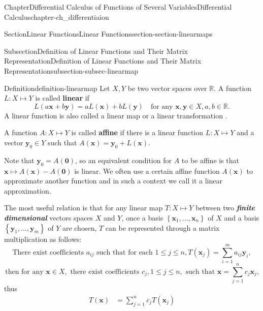 \documentclass[oneside,10pt,]{book}
\newcommand{\alert}[1]{\textbf{\textit{#1}}}
\newcommand{\terminology}[1]{\textbf{#1}}
\numberwithin{equation}{section}
\newcommand{\bx}{\mathbf{x}}
\newcommand{\by}{\mathbf{y}}
\newcommand{\bbR}{\mathbb{R}}
\newcommand{\amp}{&}
\begin{document}
\begin{chapterptx}{Chapter}{Differential Calculus of Functions of Several Variables}{}{Differential Calculus}{}{}{chapter-ch_differentiaion}
\begin{sectionptx}{Section}{Linear Functions}{}{Linear Functions}{}{}{section-section-linearmaps}
\typeout{************************************************}
%
\begin{subsectionptx}{Subsection}{Definition of  Linear Functions and Their Matrix Representation}{}{Definition of  Linear Functions and Their Matrix Representation}{}{}{subsection-subsec-linearmap}
\begin{definition}{Definition}{}{definition-linearmap}%
%
Let \(X, Y\) be two vector spaces over \(\bbR\). A function \(L: X\mapsto Y\) is called \terminology{linear} if%
\begin{equation*}
L(a \bx +b \by)=aL(\bx)+bL(\by)\quad \text{for any $\bx, \by \in X, a, b\in \bbR$.}
\end{equation*}
A linear function is also called a linear map or a linear transformation	.%
\par
A function \(A: X\mapsto Y\) is called \terminology{affine} if there is a linear function \(L: X\mapsto Y\) and a vector \(\by_0\in Y\) such that \(A(\bx)=\by_0+L(\bx)\).%
\end{definition}
Note that \(\by_0=A(\mathbf 0)\), so an equivalent condition for \(A\) to be affine is that \(\bx\mapsto A(\bx)-A(\mathbf 0)\)	is linear.  We often use a certain affine function \(A(\bx)\) to approximate another function and in such a context we call it a linear approximation.%
\par
The most useful relation is that for any linear map \(T:X\mapsto Y\) between two \alert{finite dimensional} vectors spaces \(X\) and \(Y\), once a basis \(\left\{{\mathbf x}_{1}, \ldots, {\mathbf x}_{n}\right\}\) of \(X\)  and a basis \(\left\{{\mathbf y}_{1}, \ldots, {\mathbf y}_{m}\right\}\) of \(Y\) are chosen, \(T\) can be represented through a matrix multiplication as follows:%
\begin{equation}
\text{There exist coefficients } a_{ij} \text{ such that for each } 1\le j \le n, 
T( {\mathbf x}_{j})=\sum_{i=1}^{m}a_{ij} {\mathbf y}_{i},\label{men-linear-basis}
\end{equation}
%
\begin{equation*}
\text{then  for any } {\mathbf x} \in X, \text{ there exist coefficients } c_{j}, 1\le j \le n, 
\text{ such that  ${\mathbf x}= \sum_{j=1}^{n}c_{j} {\mathbf x}_{j}$,}
\end{equation*}
thus%
\begin{align*}
T({\mathbf x}) \amp =\sum_{j=1}^{n}c_{j}  T({\mathbf x}_{j}) \\

\end{align*}
\end{subsectionptx}
\end{sectionptx}
\end{chapterptx}
\end{document}
